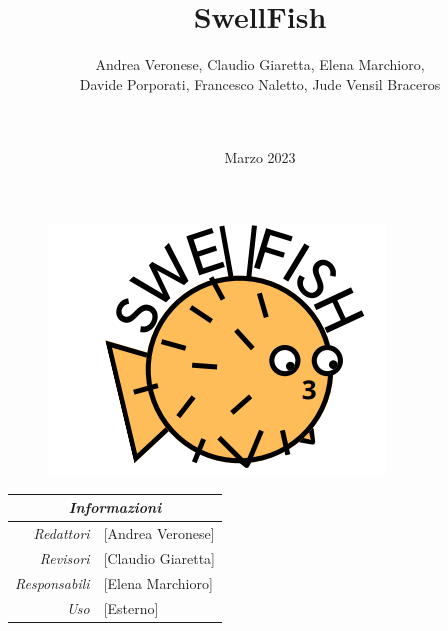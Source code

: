 \documentclass[12pt]{article}
\begin{document}
\title{SwellFish}
\begin{figure}
\centering
\includegraphics[scale=0.5]{Swellfish_logo.png}
\end{figure}
\author{Andrea Veronese, Claudio Giaretta, Elena Marchioro,\\
Davide Porporati, Francesco Naletto, Jude Vensil Braceros \\ \\
 \href{swellfish14@gmail.com}{} \\
} 
\date{Marzo 2023}



\maketitle
\begin{center}
    \begin{tabular}{r | l}
		\multicolumn{2}{c}{\textit{Informazioni}}\\
		\hline
		
			\textit{Redattori} &
			[Andrea Veronese]\makecell{}\\
		
			\textit{Revisori} &
			[Claudio Giaretta]\makecell{}\\
			\textit{Responsabili} &
			[Elena Marchioro]\makecell{}\\
		      \textit{Uso} & 
                [Esterno]\makecell{}\\
\end{tabular}
\end{center}


\tableofcontents
\printindex 
\end{document}
